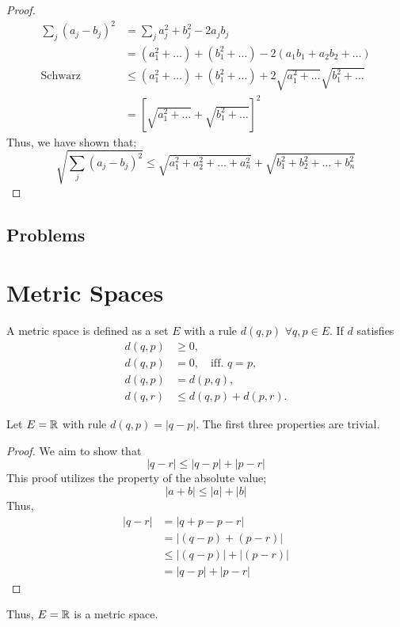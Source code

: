 \begin{proof}
    \begin{align*}
        \sum_j (a_j - b_j)^2  &= \sum_j a_j^2 + b_j^2 - 2a_jb_j \\
        &= (a_1^2 + \dots) + (b_1^2 + \dots) - 2(a_1b_1 + a_2b_2 + \dots)\\
        \text{Schwarz }&\leq(a_1^2 + \dots) + (b_1^2 + \dots) +2\sqrt{a_1^2 +\dots}\sqrt{b_1^2 +\dots}\\
        &=\left[\sqrt{a_1^2 + \dots} + \sqrt{b_1^2 + \dots}\right]^2
    \end{align*}
    Thus, we have shown that;
    \begin{equation}
        \sqrt{\sum_j (a_j - b_j)^2}\leq \sqrt{a_1^2 + a_2^2+ \dots+ a_n^2} + \sqrt{b_1^2 + b_2^2+ \dots+ b_n^2}
    \end{equation}
\end{proof}



\subsection{Problems}

\section{Metric Spaces}

A metric space is defined as a set $E$ with a rule $d(q,p)$ $\forall q, p \in E$. If $d$ satisfies
\begin{equation}
    \begin{aligned}
        d(q,p) &\geq 0,\\
        d(q, p) &= 0, \quad \text{iff. }q=p, \\
        d(q,p) &= d(p, q), \\
        d(q,r) &\leq d(q, p) + d(p, r).
    \end{aligned}
\end{equation}
\begin{example}
Let $E = \mathbb{R}$ with rule $d(q, p) = |q-p|$. 
The first three properties are trivial. 
\begin{proof}
    We aim to show that 
    \begin{equation*}
        |q - r| \leq |q - p| + |p - r|
    \end{equation*}
    This proof utilizes the property of the absolute value;
    \begin{equation}
        |a + b| \leq |a| + |b|
    \end{equation}
    Thus, 
    \begin{align*}
        |q - r| &= |q + p - p - r| \\
        &= |(q-p)  + (p - r)| \\
        &\leq |(q-p)|  + |(p - r)| \\
        &= |q - p| + |p - r|
    \end{align*}
\end{proof} 
Thus, $E = \mathbb{R}$ is a metric space. 
\end{example}


